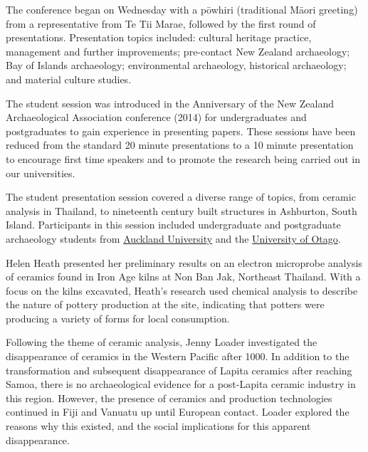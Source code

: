 The conference began on Wednesday with a pōwhiri (traditional Māori greeting) from a representative from Te Tii Marae, followed by the first round of presentations. Presentation topics included: cultural heritage practice, management and further improvements; pre-contact New Zealand archaeology; Bay of Islands archaeology; environmental archaeology, historical archaeology; and material culture studies. 

The student session was introduced in the  Anniversary of the New Zealand Archaeological Association conference (2014) for undergraduates and postgraduates to gain experience in presenting papers. These sessions have been reduced from the standard 20 minute presentations to a 10 minute presentation to encourage first time speakers and to promote the research being carried out in our universities.


The  student presentation session covered a diverse range of topics, from ceramic analysis in Thailand, to nineteenth century built structures in Ashburton, South Island. Participants in this session included undergraduate and postgraduate archaeology students from \href{http://www.arts.auckland.ac.nz/en/about/subjects-and-courses/anthropology.html}{Auckland University} and the \href{http://www.otago.ac.nz/anthropology/research/archaeology/index.html}{University of Otago}. 

Helen Heath presented her preliminary results on an electron microprobe analysis of ceramics found in Iron Age kilns at Non Ban Jak, Northeast Thailand. With a focus on the kilns excavated, Heath’s research used chemical analysis to describe the nature of pottery production at the site, indicating that potters were producing a variety of forms for local consumption. 

Following the theme of ceramic analysis, Jenny Loader investigated the disappearance of ceramics in the Western Pacific after 1000\BC. In addition to the transformation and subsequent disappearance of Lapita ceramics after reaching Samoa, there is no archaeological evidence for a post-Lapita ceramic industry in this region. However, the presence of ceramics and production technologies continued in Fiji and Vanuatu up until European contact. Loader explored the reasons why this existed, and the social implications for this apparent disappearance. 

